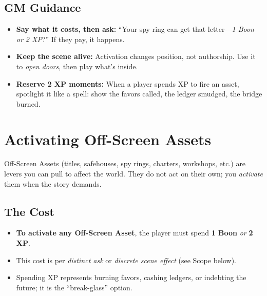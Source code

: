 \documentclass[12pt]{article}
\begin{document}
\subsection*{GM Guidance}
\begin{itemize}
  \item \textbf{Say what it costs, then ask:} ``Your spy ring can get that letter—\emph{1 Boon or 2 XP}?'' If they pay, it happens.
  \item \textbf{Keep the scene alive:} Activation changes position, not authorship. Use it to \emph{open doors}, then play what’s inside.
  \item \textbf{Reserve 2 XP moments:} When a player spends XP to fire an asset, spotlight it like a spell: show the favors called, the ledger smudged, the bridge burned.
\end{itemize}

\section{Activating Off-Screen Assets}
\label{sec:asset-activation}

Off-Screen Assets (titles, safehouses, spy rings, charters, workshops, etc.) are levers you can pull to affect the world. They do not act on their own; you \emph{activate} them when the story demands.

\subsection*{The Cost}
\begin{itemize}
  \item \textbf{To activate any Off-Screen Asset}, the player must spend \textbf{1 Boon} \emph{or} \textbf{2 XP}.
  \item This cost is per \emph{distinct ask} or \emph{discrete scene effect} (see Scope below).
  \item Spending XP represents burning favors, cashing ledgers, or indebting the future; it is the ``break-glass'' option.
\end{itemize}
\end{document}
